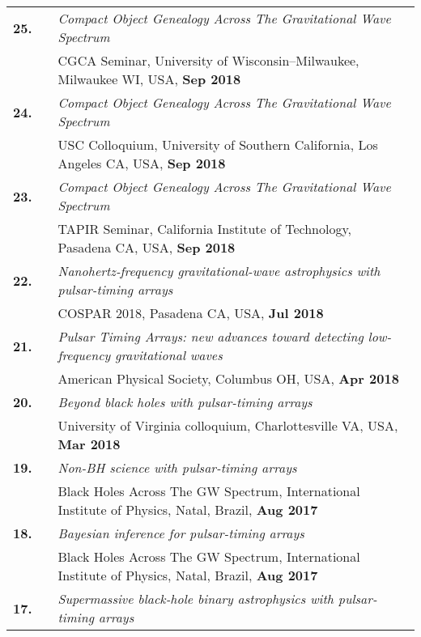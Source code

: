 \documentclass[11pt,letterpaper,sans]{moderncv}
\begin{document}
{\begin{longtable}{rp{0.3cm}p{15.8cm}}
\textbf{25.} & & \textit{Compact Object Genealogy Across The Gravitational Wave Spectrum} \\
&& CGCA Seminar, University of Wisconsin--Milwaukee, Milwaukee WI, USA, \textbf{Sep 2018} \vspace{0.09cm}\\
\textbf{24.} & & \textit{Compact Object Genealogy Across The Gravitational Wave Spectrum} \\
&& USC Colloquium, University of Southern California, Los Angeles CA, USA, \textbf{Sep 2018} \vspace{0.09cm}\\
\textbf{23.} & & \textit{Compact Object Genealogy Across The Gravitational Wave Spectrum} \\
&& TAPIR Seminar, California Institute of Technology, Pasadena CA, USA, \textbf{Sep 2018} \vspace{0.09cm}\\
\textbf{22.} & & \textit{Nanohertz-frequency gravitational-wave astrophysics with pulsar-timing arrays} \\
&& COSPAR 2018, Pasadena CA, USA, \textbf{Jul 2018} \vspace{0.09cm}\\
\textbf{21.} & & \textit{Pulsar Timing Arrays: new advances toward detecting low-frequency gravitational waves} \\
&& American Physical Society, Columbus OH, USA, \textbf{Apr 2018} \vspace{0.09cm}\\
\textbf{20.} & & \textit{Beyond black holes with pulsar-timing arrays} \\
&& University of Virginia colloquium, Charlottesville VA, USA, \textbf{Mar 2018} \vspace{0.09cm}\\
\textbf{19.} & & \textit{Non-BH science with pulsar-timing arrays} \\
&& Black Holes Across The GW Spectrum, International Institute of Physics, Natal, Brazil, \textbf{Aug 2017} \vspace{0.09cm}\\
\textbf{18.} & & \textit{Bayesian inference for pulsar-timing arrays} \\
&& Black Holes Across The GW Spectrum, International Institute of Physics, Natal, Brazil, \textbf{Aug 2017} \vspace{0.09cm}\\
\textbf{17.} & & \textit{Supermassive black-hole binary astrophysics with pulsar-timing arrays} \\

\end{longtable}}
\end{document}
